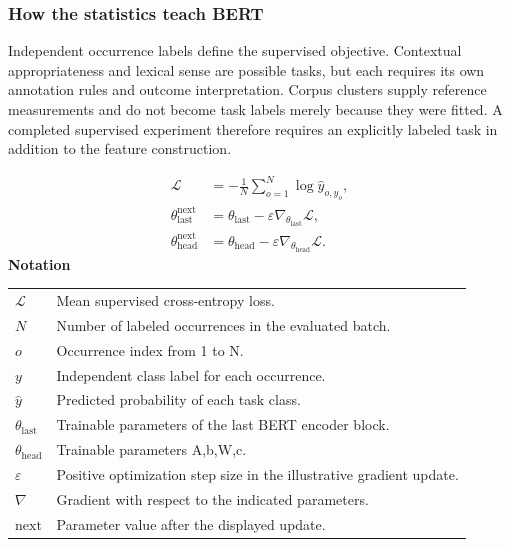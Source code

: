 \documentclass[10pt,letterpaper]{article}
\newcommand{\notlabel}{\noindent\textbf{Notation}\par\nobreak\vspace{4pt}}
\begin{document}
\subsubsection{How the statistics teach BERT}
Independent occurrence labels define the supervised objective. Contextual appropriateness and lexical sense are possible tasks, but each requires its own annotation rules and outcome interpretation. Corpus clusters supply reference measurements and do not become task labels merely because they were fitted. A completed supervised experiment therefore requires an explicitly labeled task in addition to the feature construction.\par

\par\noindent\begin{minipage}{\linewidth}
\begin{equation}\label{eq:loss}
\begin{aligned}\mathcal L&=-\frac1N\sum_{o=1}^N\log\widehat y_{o,y_o},\\\theta_{\mathrm{last}}^{\mathrm{next}}&=\theta_{\mathrm{last}}-\varepsilon\nabla_{\theta_{\mathrm{last}}}\mathcal L,\\\theta_{\mathrm{head}}^{\mathrm{next}}&=\theta_{\mathrm{head}}-\varepsilon\nabla_{\theta_{\mathrm{head}}}\mathcal L.\end{aligned}
\end{equation}
\notlabel
{\fontsize{8.5}{10.5}\selectfont\setlength{\tabcolsep}{0pt}\renewcommand{\arraystretch}{1.12}
\begin{tabularx}{\linewidth}{@{}p{.14\linewidth}X@{}}
$\mathcal L$ & Mean supervised cross-entropy loss.\\
$N$ & Number of labeled occurrences in the evaluated batch.\\
$o$ & Occurrence index from 1 to N.\\
$y$ & Independent class label for each occurrence.\\
$\widehat y$ & Predicted probability of each task class.\\
$\theta_{\mathrm{last}}$ & Trainable parameters of the last BERT encoder block.\\
$\theta_{\mathrm{head}}$ & Trainable parameters A,b,W,c.\\
$\varepsilon$ & Positive optimization step size in the illustrative gradient update.\\
$\nabla$ & Gradient with respect to the indicated parameters.\\
$\mathrm{next}$ & Parameter value after the displayed update.\\
\end{tabularx}}
\par\vspace{2pt}
\end{minipage}\par
\end{document}
